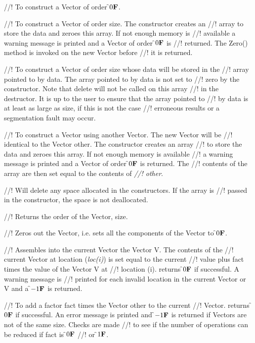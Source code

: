 //! To construct a Vector of order \f$0{\bf F}$.

//! To construct a Vector of order \p size. The constructor creates an
//! array to store the data and zeroes this array. If not enough memory is
//! available a warning message is printed and a Vector of order \f$0{\bf F}$ is 
//! returned. The Zero()  method is invoked on the new Vector before
//! it is returned. 

//! To construct a Vector of order \p size whose data will be stored in the
//! array pointed to by \p data. The array pointed to by data is not set to
//! zero by the constructor. Note that delete will not be called on this array
//! in the destructor. It is up to the user to ensure that the array pointed to
//! by \p data is at least as large as \p size, if this is not the case
//! erroneous results or a segmentation fault may occur.

//! To construct a Vector using another Vector. The new Vector will be
//! identical to the Vector \p other. The constructor creates an array
//! to store the data and zeroes this array. If not enough memory is available
//! a warning message is printed and a Vector of order \f$0{\bf F}$ is returned. The
//! contents of the array are then set equal to the contents of {\em
//! other}. 

//! Will delete any space allocated in the constructors. If the array is
//! passed in the constructor, the space is not deallocated.

//! Returns the order of the Vector, \p size.

//! Zeros out the Vector, i.e. sets all the components of the Vector to
\f$0{\bf F}$.

//! Assembles into the current Vector the Vector \p V. The contents of the
//! current Vector at location ({\em loc(i)}) is set equal to the current
//! value plus \p fact times the value of the Vector \p V at
//! location (\p i). returns \f$0{\bf F}$ if successful. A warning message is
//! printed for each invalid location in the current Vector or \p V and a
\f$-1{\bf F}$ is returned. 

//! To add a factor \p fact times the Vector \p other to the current
//! Vector. returns \f$0{\bf F}$ if successful. An error message is printed and
\f$-1{\bf F}$ is returned if Vectors are not of the same size. Checks are made
//! to see if the number of operations can be reduced if \p fact is \f$0{\bf F}$
//! or \f$1{\bf F}$. 


